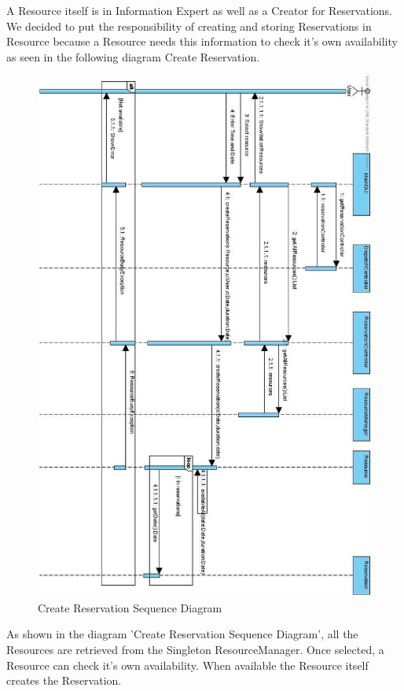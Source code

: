 			A Resource itself is in Information Expert as well as a Creator for Reservations. We decided to put the responsibility of creating and storing Reservations in Resource because a Resource needs this information to check it's own availability as seen in the following diagram Create Reservation.
			\begin{figure}[h!]
				\begin{center}
					\includegraphics[scale=0.5]{images/create_reservation.jpg}
				\end{center}
				\caption{Create Reservation Sequence Diagram}
			\end{figure}

			As shown in the diagram 'Create Reservation Sequence Diagram', all the Resources are retrieved from the Singleton ResourceManager. Once selected, a Resource can check it's own availability. When available the Resource itself creates the Reservation.

